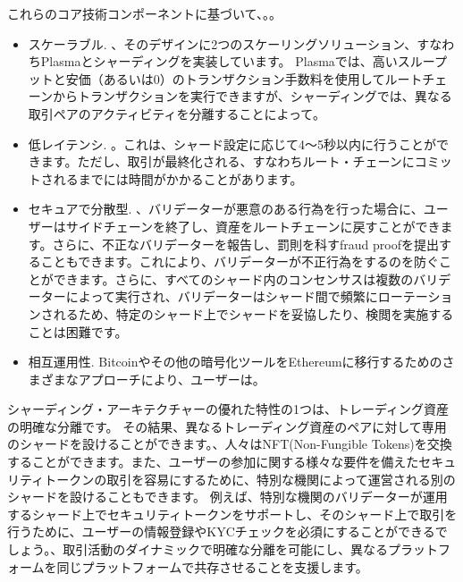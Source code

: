 これらのコア技術コンポーネントに基づいて、。。

\begin{itemize}
\item スケーラブル. 、そのデザインに2つのスケーリングソリューション、すなわちPlasmaとシャーディングを実装しています。 Plasmaでは、高いスループットと安価（あるいは0）のトランザクション手数料を使用してルートチェーンからトランザクションを実行できますが、シャーディングでは、異なる取引ペアのアクティビティを分離することによって。
\item 低レイテンシ. 。これは、シャード設定に応じて4〜5秒以内に行うことができます。ただし、取引が最終化される、すなわちルート・チェーンにコミットされるまでには時間がかかることがあります。
\item セキュアで分散型. 、バリデーターが悪意のある行為を行った場合に、ユーザーはサイドチェーンを終了し、資産をルートチェーンに戻すことができます。さらに、不正なバリデーターを報告し、罰則を科すfraud proofを提出することもできます。これにより、バリデーターが不正行為をするのを防ぐことができます。さらに、すべてのシャード内のコンセンサスは複数のバリデーターによって実行され、バリデーターはシャード間で頻繁にローテーションされるため、特定のシャード上でシャードを妥協したり、検閲を実施することは困難です。
\item 相互運用性. Bitcoinやその他の暗号化ツールをEthereumに移行するためのさまざまなアプローチにより、ユーザーは。
\end{itemize}

シャーディング・アーキテクチャーの優れた特性の1つは、トレーディング資産の明確な分離です。 その結果、異なるトレーディング資産のペアに対して専用のシャードを設けることができます。、人々はNFT(Non-Fungible Tokens)を交換することができます。また、ユーザーの参加に関する様々な要件を備えたセキュリティトークンの取引を容易にするために、特別な機関によって運営される別のシャードを設けることもできます。 例えば、特別な機関のバリデーターが運用するシャード上でセキュリティトークンをサポートし、そのシャード上で取引を行うために、ユーザーの情報登録やKYCチェックを必須にすることができるでしょう。、取引活動のダイナミックで明確な分離を可能にし、異なるプラットフォームを同じプラットフォームで共存させることを支援します。

